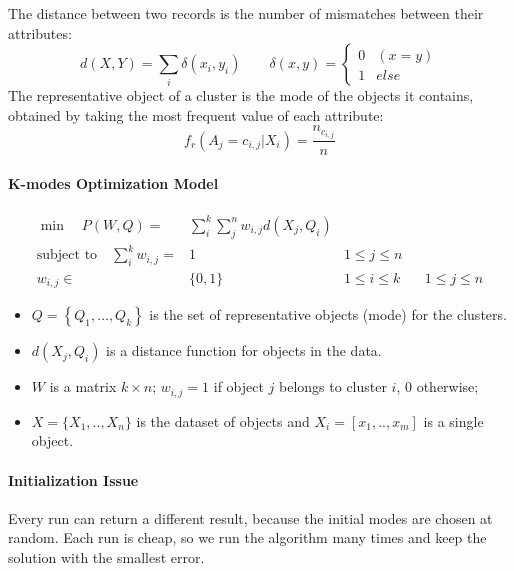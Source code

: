 The distance between two records is the number of mismatches between their attributes:
\begin{equation}
    d(X,Y) = \sum_i \delta(x_i, y_i) \qquad
    \delta(x,y) = \begin{cases}
        0 & (x = y) \\
        1 & else
    \end{cases}
\end{equation}
The representative object of a cluster is the mode of the objects it contains, obtained by taking the most frequent value of each attribute: \begin{equation*} f_r(A_j=c_{i,j} | X_i) = \dfrac{n_{c_{i,j}}}{n}
\end{equation*}

\paragraph{K-modes Optimization Model}
\begin{align*}
    \min\quad P(W,Q) = &\sum_{i}^k \sum_{j}^n w_{i,j} d(X_j, Q_i)\\
    \text{subject to}\quad \sum_{i}^k w_{i,j} = &1 &  1 \leq j \leq n \\
    w_{i,j} \in& \{0,1\} & 1 \leq i \leq k && 1 \leq j \leq n 
\end{align*}
\begin{itemize}
    \item $Q = \left\{Q_1,\dots,Q_k\right\}$ is the set of representative objects (mode) for the clusters.
    \item $d(X_j, Q_i)$ is a distance function for objects in the data.
    \item $W$ is a matrix $k \times n$; $w_{i,j}= 1$ if object $j$ belongs to cluster $i$, 0 otherwise;
    \item $X=\{X_1,..,X_n\}$ is the dataset of objects and $X_i=[x_1,..,x_m]$ is a single object.
\end{itemize}

\paragraph{Initialization Issue} Every run can return a different result, because the initial modes are chosen at random. Each run is cheap, so we run the algorithm many times and keep the solution with the smallest error.

